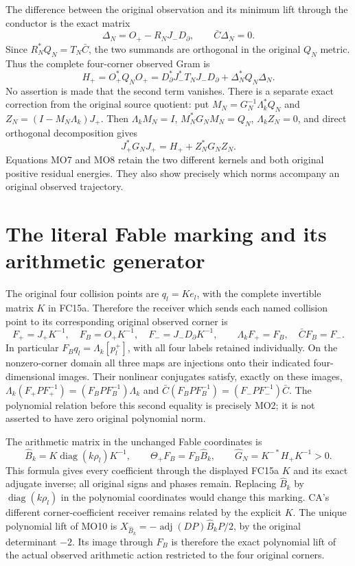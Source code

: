 \documentclass[11pt]{article}
\newcommand{\diag}{\operatorname{diag}}
\begin{document}
The difference between the original observation and its minimum
lift through the conductor is the exact matrix
\[
 \Delta_N=O_+-R_NJ_-D_\partial,\qquad
 \bar C\Delta_N=0. \tag{MO6}
\]
Since $R_N^*Q_N=T_N\bar C$, the two summands are orthogonal
in the original $Q_N$ metric. Thus the complete four-corner
observed Gram is
\[
 H_+=O_+^*Q_NO_+
 =D_\partial^*J_-^*T_NJ_-D_\partial+
                   \Delta_N^*Q_N\Delta_N. \tag{MO7}
\]
No assertion is made that the second term vanishes.
There is a separate exact correction from the original source
quotient: put $M_N=G_N^{-1}\Lambda_k^*Q_N$ and
$Z_N=(I-M_N\Lambda_k)J_+$. Then
$\Lambda_kM_N=I$, $M_N^*G_NM_N=Q_N$,
$\Lambda_kZ_N=0$, and direct orthogonal decomposition gives
\[
 J_+^*G_NJ_+=H_++Z_N^*G_NZ_N. \tag{MO8}
\]
Equations MO7 and MO8 retain the two different kernels and both
original positive residual energies. They also show precisely
which norms accompany an original observed trajectory.

\section{The literal Fable marking and its arithmetic generator}
The original four collision points are $q_l=Ke_l$, with the
complete invertible matrix $K$ in FC15a. Therefore the receiver
which sends each named collision point to its corresponding
original observed corner is
\[
 F_+=J_+K^{-1},\quad F_B=O_+K^{-1},\quad
 F_-=J_-D_\partial K^{-1},\qquad
 \Lambda_kF_+=F_B,\quad\bar CF_B=F_-.
 \tag{MO9}
\]
In particular $F_Bq_l=\Lambda_k[p_l^+]$, with all four labels
retained individually. On the nonzero-corner domain all three
maps are injections onto their indicated four-dimensional images.
Their nonlinear conjugates satisfy, exactly on these images,
$\Lambda_k(F_+PF_+^{-1})=(F_BPF_B^{-1})\Lambda_k$ and
$\bar C(F_BPF_B^{-1})=(F_-PF_-^{-1})\bar C$.
The polynomial relation before this second equality is precisely
MO2; it is not asserted to have zero original polynomial norm.

The arithmetic matrix in the unchanged Fable coordinates is
\[
 \widehat B_k=K\diag(k\rho_l)K^{-1},\qquad
 \Theta_+F_B=F_B\widehat B_k,
 \qquad \widehat G_N=K^{-*}H_+K^{-1}>0.
 \tag{MO10}
\]
This formula gives every coefficient through the displayed FC15a
$K$ and its exact adjugate inverse; all original signs and phases
remain. Replacing $\widehat B_k$ by $\diag(k\rho_l)$ in the
polynomial coordinates would change this marking. CA's different
corner-coefficient receiver remains related by the explicit $K$.
The unique polynomial lift of MO10 is
$X_{\widehat B_k}=-\operatorname{adj}(DP)\widehat B_kP/2$,
by the original determinant $-2$. Its image through $F_B$ is
therefore the exact polynomial lift of the actual observed
arithmetic action restricted to the four original corners.
\end{document}
